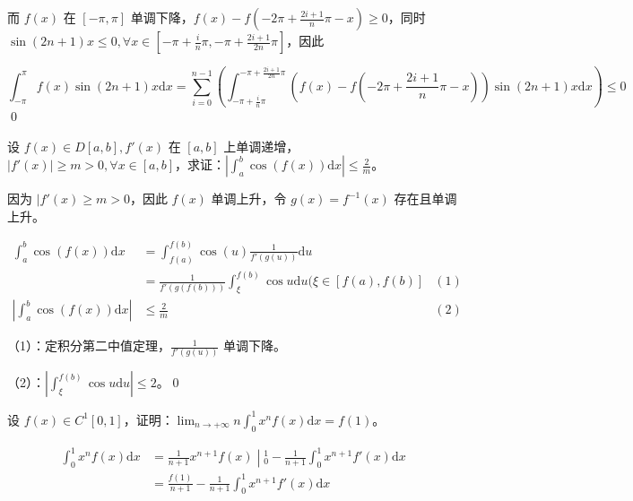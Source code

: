 而 $\displaystyle f( x)$ 在 $\displaystyle [ -\pi ,\pi ]$ 单调下降，$\displaystyle f( x) -f\left( -2\pi +\frac{2i+1}{n} \pi -x\right) \geqslant 0$，同时 $\displaystyle \sin( 2n+1) x\leqslant 0,\forall x\in \left[ -\pi +\frac{i}{n} \pi ,-\pi +\frac{2i+1}{2n} \pi \right]$，因此

\begin{equation*}
	\int _{-\pi }^{\pi } f( x)\sin( 2n+1) x\mathrm{d} x=\sum _{i=0}^{n-1}\left(\int _{-\pi +\frac{i}{n} \pi }^{-\pi +\frac{2i+1}{2n} \pi }\left( f( x) -f\left( -2\pi +\frac{2i+1}{n} \pi -x\right)\right)\sin( 2n+1) x\mathrm{d} x\right) \leqslant 0
\end{equation*}\qed 





\begin{ques}
	设 $\displaystyle f( x) \in D[ a,b] ,f'( x)$ 在 $\displaystyle [ a,b]$ 上单调递增，$\displaystyle |f'( x) |\geqslant m >0,\forall x\in [ a,b]$，求证：$\displaystyle \left| \int _{a}^{b}\cos( f( x))\mathrm{d} x\right| \leqslant \frac{2}{m}$。
\end{ques}



因为 $\displaystyle |f'( x) \geqslant m >0$，因此 $\displaystyle f( x)$ 单调上升，令 $\displaystyle g( x) =f^{-1}( x)$ 存在且单调上升。


\begin{align*}
	\int _{a}^{b}\cos( f( x))\mathrm{d} x & =\int _{f( a)}^{f( b)}\cos( u)\frac{1}{f'( g( u))}\mathrm{d} u\\
	& =\frac{1}{f'( g( f( b)))}\int _{\xi }^{f( b)}\cos u\mathrm{d} u( \xi \in [ f( a) ,f( b)] &(1)\\
	\left| \int _{a}^{b}\cos( f( x))\mathrm{d} x\right|  & \leqslant \frac{2}{m} & (2)
\end{align*}


（1）：定积分第二中值定理，$\displaystyle \frac{1}{f'( g( u))}$ 单调下降。

（2）：$\displaystyle \left| \int _{\xi }^{f( b)}\cos u\mathrm{d} u\right| \leqslant 2$。\qed 



\begin{ques}
	设 $\displaystyle f( x) \in C^{1}[ 0,1]$，证明：$\displaystyle \lim _{n\rightarrow +\infty } n\int _{0}^{1} x^{n} f( x)\mathrm{d} x=f( 1)$。
\end{ques}
\begin{align*}
	\int _{0}^{1} x^{n} f( x)\mathrm{d} x & =\left. \frac{1}{n+1} x^{n+1} f( x)\middle| _{0}^{1}\right. -\frac{1}{n+1}\int _{0}^{1} x^{n+1} f'( x)\mathrm{d} x\\
	& =\frac{f( 1)}{n+1} -\frac{1}{n+1}\int _{0}^{1} x^{n+1} f'( x)\mathrm{d} x
\end{align*}


